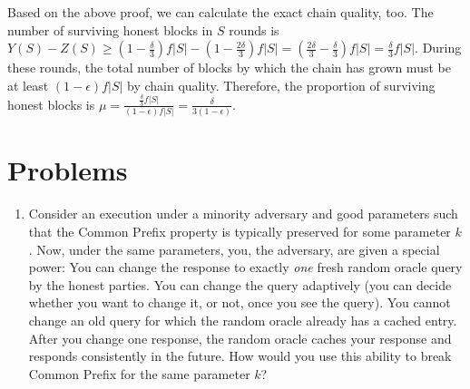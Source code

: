 Based on the above proof, we can calculate the exact chain quality,
too.
The number of surviving honest blocks in $S$ rounds is
$Y(S) - Z(S) \geq (1 - \frac{\delta}{3})f|S| - (1 - \frac{2\delta}{3})f|S|
= (\frac{2\delta}{3} - \frac{\delta}{3})f|S| = \frac{\delta}{3}f|S|$.
During these rounds, the total number of blocks by which the chain has
grown must be at least $(1 - \epsilon)f|S|$ by chain quality. Therefore,
the proportion of surviving honest blocks is
$\mu = \frac{\frac{\delta}{3}f|S|}{(1 - \epsilon)f|S|} = \frac{\delta}{3(1 - \epsilon)}$.

\section*{Problems}

\begin{enumerate}
  \item Consider an execution under a minority adversary and good parameters such that
        the Common Prefix property is typically preserved for some parameter $k$. Now,
        under the same parameters, you, the adversary, are given a special power: You
        can change the response to exactly \emph{one} fresh random oracle query by the
        honest parties. You can change the query adaptively (you can decide whether you
        want to change it, or not, once you see the query). You cannot change an old query
        for which the random oracle already has a cached entry. After you change one response,
        the random oracle caches your response and responds consistently in the future.
        How would you use this ability to break Common Prefix for the same parameter $k$?
\end{enumerate}
